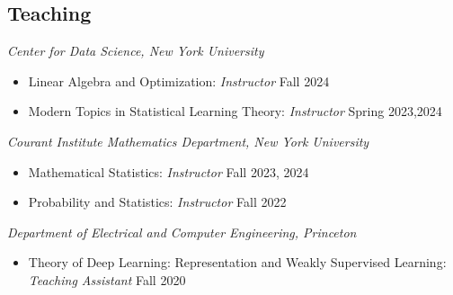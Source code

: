 \documentclass[margin, 10pt]{res} %
\begin{document}
\begin{resume}
\begin{comment}
\section{SOFTWARE}
 \textit{Github: }\url{https://github.com/cecilialeiqi/}\\
 {\sl SPIRAL} \hfill May 2016 - July 2017
 \begin{itemize}
   \item Feature representation learning of any time series data
    \end{itemize}
 {\sl DDI} \hfill Jan 2017 - May 2017
 \begin{itemize}
   \item Use an inductive tensor completion based methods to predict drug-drug interactions
   \end{itemize}
   {\sl NUTF} \hfill August 2016 - February 2017
   \begin{itemize}
     \item Negative-Unlabeled Tensor Factorization for Location\ Context 
       Inference from Inaccurate Mobility Data
      \end{itemize}
 \end{itemize} 
\end{comment}

\section{Teaching}


{\sl Center for Data Science, New York University} 
\begin{itemize}
	\item Linear Algebra and Optimization: {\sl Instructor} \hfill Fall 2024
	\item Modern Topics in Statistical Learning Theory:  {\sl Instructor} \hfill Spring 2023,2024
\end{itemize}


{\sl Courant Institute Mathematics Department, New York University} 
\begin{itemize}
	\item Mathematical Statistics: {\sl Instructor} \hfill Fall 2023, 2024
	\item Probability and Statistics: {\sl Instructor} \hfill Fall 2022
\end{itemize}

{\sl Department of Electrical and Computer Engineering, Princeton} 
\begin{itemize}
	\item Theory of Deep Learning: Representation and Weakly Supervised Learning: {\sl Teaching Assistant} \hfill Fall 2020
\end{itemize}



\end{resume}
\end{document}
